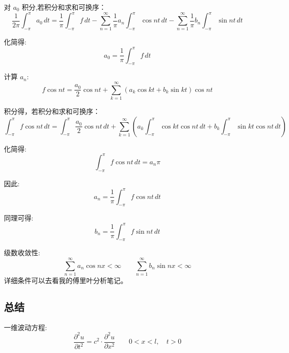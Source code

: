 \documentclass[12pt,a4paper]{article}
\numberwithin{subsection}{section}   %
\numberwithin{subsubsection}{subsection}
\theoremstyle{plain}
\theoremstyle{definition}
\theoremstyle{remark}
\theoremstyle{verification}
\begin{document}
	对 \( a_0 \) 积分,若积分和求和可换序：
	\begin{equation}
		\frac{1}{2\pi} \int_{-\pi}^{\pi} a_0 \, dt = \frac{1}{\pi} \int_{-\pi}^{\pi} f \, dt - \sum_{n=1}^{\infty} \frac{1}{\pi} a_n \int_{-\pi}^{\pi} \cos nt \, dt - \sum_{n=1}^{\infty} \frac{1}{\pi} b_n \int_{-\pi}^{\pi} \sin nt \, dt
	\end{equation}
	
	化简得:
	\begin{equation}
		a_0 = \frac{1}{\pi} \int_{-\pi}^{\pi} f \, dt
	\end{equation}
	
	计算 \( a_n \):
	\begin{equation}
		f \cos nt = \frac{a_0}{2} \cos nt + \sum_{k=1}^{\infty} \left( a_k \cos kt + b_k \sin kt \right) \cos nt
	\end{equation}
	
	积分得，若积分和求和可换序：
	\begin{equation}
		\int_{-\pi}^{\pi} f \cos nt \, dt = \int_{-\pi}^{\pi} \frac{a_0}{2} \cos nt \, dt + \sum_{k=1}^{\infty} \left( a_k \int_{-\pi}^{\pi} \cos kt \cos nt \, dt + b_k \int_{-\pi}^{\pi} \sin kt \cos nt \, dt \right)
	\end{equation}
	
	化简得:
	\begin{equation}
		\int_{-\pi}^{\pi} f \cos nt \, dt = a_n \pi
	\end{equation}
	
	因此:
	\begin{equation}
		a_n = \frac{1}{\pi} \int_{-\pi}^{\pi} f \cos nt \, dt
	\end{equation}
	
	同理可得:
	\begin{equation}
		b_n = \frac{1}{\pi} \int_{-\pi}^{\pi} f \sin nt \, dt
	\end{equation}
	
	级数收敛性:
	\begin{equation}
		\sum_{n=1}^{\infty} a_n \cos nx < \infty \qquad \sum_{n=1}^{\infty} b_n \sin nx < \infty
	\end{equation}
	详细条件可以去看我的傅里叶分析笔记。
	
	\subsection{总结}
	
	一维波动方程:
	\begin{equation}
		\frac{\partial^2 u}{\partial t^2} = c^2 \cdot \frac{\partial^2 u}{\partial x^2} \qquad 0 < x < l, \quad t > 0
	\end{equation}
	
\end{document}
